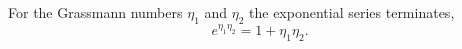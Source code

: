 \documentclass{article}
\begin{document}
For the Grassmann numbers $\eta_1$ and $\eta_2$ the exponential series terminates,
\begin{equation}
e^{\eta_1\eta_2} = 1 + \eta_1\eta_2 .
\label{eq:g}
\end{equation}
\end{document}
